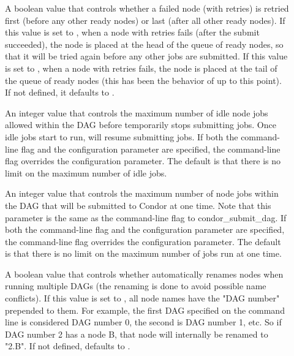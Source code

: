 \begin{description}
\item[]
\label{param:DAGManRetryNodeFirst}
A boolean value that controls whether a failed node (with retries)
is retried first (before any other ready nodes) or last (after all
other ready nodes).  If this value is set to , when a
node with retries fails (after the submit succeeded), the node is
placed at the head of the queue of ready nodes, so that it will be
tried again before any other jobs are submitted.  If this value is
set to , when a node with retries fails, the node
is placed at the tail of the queue of ready nodes (this has been the
behavior of  up to this point).  If not defined, it
defaults to .

\item[]
\label{param:DAGManMaxJobsIdle}
An integer value that controls the maximum number of idle node jobs
allowed within the DAG before  temporarily stops
submitting jobs.  Once idle jobs start to run,  will
resume submitting jobs.  If both the command-line flag and the
configuration parameter are specified, the command-line flag overrides
the configuration parameter.  The default is that there is no limit
on the maximum number of idle jobs.

\item[]
\label{param:DAGManMaxJobsSubmitted}
An integer value that controls the maximum number of node jobs within the
DAG that will  be submitted to Condor at one time.  Note that this
parameter is the same as the  command-line flag
to condor\_submit\_dag.  If both the command-line flag and the
configuration parameter are specified, the command-line flag overrides
the configuration parameter.  The default is that there is no limit
on the maximum number of jobs run at one time.

\item[]
\label{param:DAGManMungeNodeNames}
A boolean value that controls whether  automatically
renames nodes when running multiple DAGs (the renaming is done to
avoid possible name conflicts).  If this value is set to ,
all node names have the "DAG number" prepended to them.  For example,
the first DAG specified on the  command line is
considered DAG number 0, the second is DAG number 1, etc.  So if
DAG number 2 has a node B, that node will internally be renamed
to "2.B".
If not defined,  defaults to .


\end{description}
